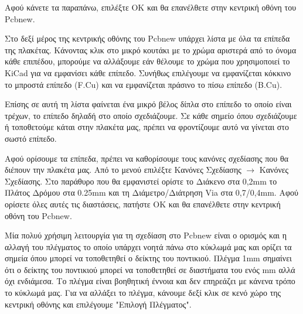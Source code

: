 \documentclass[a4paper]{article}
\begin{document}
Αφού κάνετε τα παραπάνω, επιλέξτε ΟΚ και θα επανέλθετε στην κεντρική οθόνη του \textenglish{Pcbnew}.

\begin{figure}
  \begin{center}
    \label{fig:kicad-main}
  \end{center}
\end{figure}

Στο δεξί μέρος της κεντρικής οθόνης του \textenglish{Pcbnew} υπάρχει λίστα με όλα τα επίπεδα της πλακέτας. Κάνοντας κλικ στο μικρό κουτάκι με το χρώμα αριστερά από το όνομα κάθε επιπέδου, μπορούμε να αλλάξουμε εάν θέλουμε το χρώμα που χρησιμοποιεί το \textenglish{KiCad} για να εμφανίσει κάθε επίπεδο. Συνήθως επιλέγουμε να εμφανίζεται κόκκινο το μπροστά επίπεδο (F.Cu) και να εμφανίζεται πράσινο το πίσω επίπεδο (B.Cu).

Επίσης σε αυτή τη λίστα φαίνεται ένα μικρό βέλος δίπλα στο επίπεδο το οποίο είναι τρέχων, το επίπεδο δηλαδή στο οποίο σχεδιάζουμε. Σε κάθε σημείο όπου σχεδιάζουμε ή τοποθετούμε κάται στην πλακέτα μας, πρέπει να φροντίζουμε αυτό να γίνεται στο σωστό επίπεδο.

Αφού ορίσουμε τα επίπεδα, πρέπει να καθορίσουμε τους κανόνες σχεδίασης που θα διέπουν την πλακέτα μας. Από το μενού επιλέξτε Κανόνες Σχεδίασης $\rightarrow$ Κανόνες Σχεδίασης. Στο παράθυρο που θα εμφανιστεί ορίστε το Διάκενο στα 0,2mm το Πλάτος Δρόμου στα 0.25mm και τη Διάμετρο/Διάτρηση Via στα 0,7/0,4mm. Αφού ορίσετε όλες αυτές τις διαστάσεις, πατήστε ΟΚ και θα επανέλθετε στην κεντρική οθόνη του \textenglish{Pcbnew}.

\begin{figure}
  \begin{center}
    \label{fig:kicad-main}
  \end{center}
\end{figure}


Μία πολυύ χρήσιμη λειτουργία για τη σχεδίαση στο \textenglish{Pcbnew} είναι ο ορισμός και η αλλαγή του πλέγματος το οποίο υπάρχει νοητά πάνω στο κύκλωμά μας και ορίζει τα σημεία όπου μπορεί να τοποθετηθεί ο δείκτης του ποντικιού. Πλέγμα 1mm σημαίνει ότι ο δείκτης του ποντικιού μπορεί να τοποθετηθεί σε διαστήματα του ενός mm αλλά όχι ενδιάμεσα. Το πλέγμα είναι βοηθητική έννοια και δεν επηρεάζει με κάνενα τρόπο το κύκλωμά μας. Για να αλλάξει το πλέγμα, κάνουμε δεξί κλικ σε κενό χώρο της κεντρική οθόνης και επιλέγουμε "Επιλογή Πλέγματος".
\end{document}
